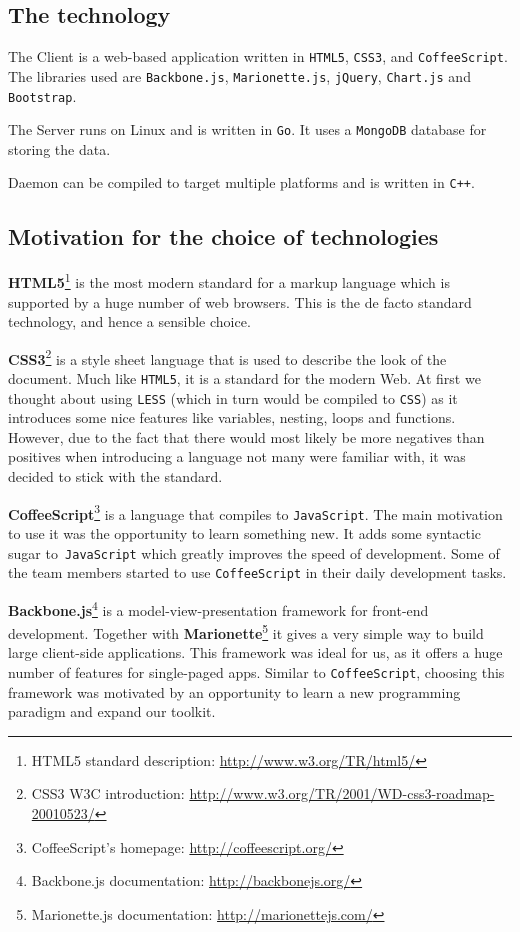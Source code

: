 \documentclass{l3proj}
\begin{document}
\subsection{The technology}

The Client is a web-based application written in \texttt{HTML5}, \texttt{CSS3}, and \texttt{CoffeeScript}. The libraries used are \texttt{Backbone.js}, \texttt{Marionette.js}, \texttt{jQuery}, \texttt{Chart.js} and \texttt{Bootstrap}.

The Server runs on Linux and is written in \texttt{Go}. It uses a \texttt{MongoDB} database for storing the data.

Daemon can be compiled to target multiple platforms and is written in \texttt{C++}.

\subsection{Motivation for the choice of technologies}

\textbf{HTML5}\footnote{\raggedright{}HTML5 standard description: \url{http://www.w3.org/TR/html5/}} is the most modern standard for a markup language which is supported by a huge number of web browsers. This is the de facto standard technology, and hence a sensible choice.

\textbf{CSS3}\footnote{\raggedright{}CSS3 W3C introduction: \url{http://www.w3.org/TR/2001/WD-css3-roadmap-20010523/}} is a style sheet language that is used to describe the look of the document. Much like \texttt{HTML5}, it is a standard for the modern Web. At first we thought about using \texttt{LESS} (which in turn would be compiled to \texttt{CSS}) as it introduces some nice features like variables, nesting, loops and functions. However, due to the fact that there would most likely be more negatives than positives when introducing a language not many were familiar with, it was decided to stick with the standard.

\textbf{CoffeeScript}\footnote{\raggedright{}CoffeeScript's homepage: \url{http://coffeescript.org/}} is a language that compiles to \texttt{JavaScript}. The main motivation to use it was the opportunity to learn something new. It adds some syntactic sugar to\texttt{ JavaScript} which greatly improves the speed of development. Some of the team members started to use \texttt{CoffeeScript} in their daily development tasks.

\textbf{Backbone.js}\footnote{\raggedright{}Backbone.js documentation: \url{http://backbonejs.org/}} is a model-view-presentation framework for front-end development. Together with \textbf{Marionette}\footnote{\raggedright{}Marionette.js documentation: \url{http://marionettejs.com/}} it gives a very simple way to build large client-side applications. This framework was ideal for us, as it offers a huge number of features for single-paged apps. Similar to \texttt{CoffeeScript}, choosing this framework was motivated by an opportunity to learn a new programming paradigm and expand our toolkit.
\end{document}
